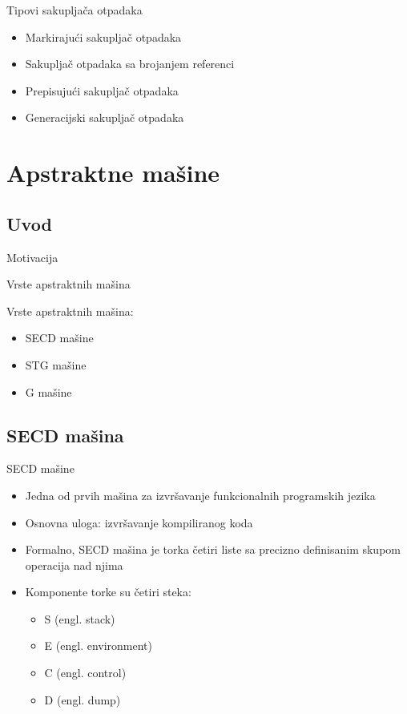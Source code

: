 \documentclass[xcolor={dvipsnames}, 11pt]{beamer}
\begin{document}
\begin{frame}{Tipovi sakupljača otpadaka}
	\begin{itemize}
		\item Markirajući sakupljač otpadaka
		\item Sakupljač otpadaka sa brojanjem referenci
		\item Prepisujući sakupljač otpadaka
		\item Generacijski sakupljač otpadaka
	\end{itemize}
\end{frame}



\section{Apstraktne mašine}
\subsection{Uvod}
\begin{frame}{Motivacija}

\end{frame}

\begin{frame}{Vrste apstraktnih mašina}

	Vrste apstraktnih mašina:
	\begin{itemize}
	\item SECD mašine
	\item STG mašine
	\item G mašine
	\end{itemize}

\end{frame}

\subsection{SECD mašina}

\begin{frame}{SECD mašine}
	\begin{itemize}
	\item Jedna od prvih mašina za izvršavanje funkcionalnih programskih jezika
	\item Osnovna uloga: izvršavanje kompiliranog koda
	\item Formalno, SECD mašina je torka četiri liste sa precizno definisanim skupom operacija nad njima
	\item Komponente torke su četiri steka: 
		\begin{itemize}
		\item S (engl. stack)
		\item E (engl. environment)
		\item C (engl. control)
		\item D	(engl. dump)
		\end{itemize}
	\end{itemize}
	
\end{frame}
\end{document}
